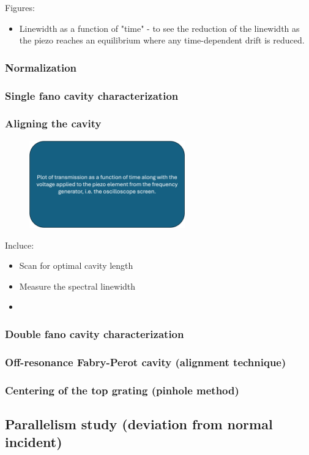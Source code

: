 Figures: 
\begin{itemize}
    \item Linewidth as a function of "time" - to see the reduction of the linewidth as the piezo reaches an equilibrium where any time-dependent drift is reduced. 
\end{itemize}

\subsubsection{Normalization}

\subsubsection{Single fano cavity characterization} 

\subsubsection{Aligning the cavity}

\begin{figure}[h!]
    \centering
    \includegraphics[width=0.6\textwidth]{figures/placerholder.png}
    \caption{}
    \label{fig:placeholder}
\end{figure}

Incluce: 
\begin{itemize}
    \item Scan for optimal cavity length
    \item Measure the spectral linewidth
    \item 
\end{itemize}

\subsubsection{Double fano cavity characterization}

\subsubsection{Off-resonance Fabry-Perot cavity (alignment technique)}

\subsubsection{Centering of the top grating (pinhole method)}

\subsection{Parallelism study (deviation from normal incident)}


